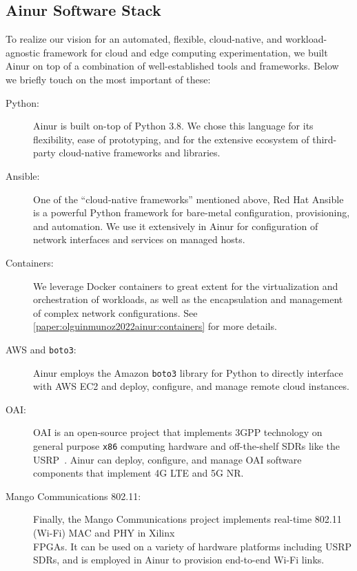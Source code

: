 \subsection{Ainur Software Stack}

To realize our vision for an automated, flexible, cloud-native, and workload-agnostic framework for cloud and edge computing experimentation, we built Ainur on top of a combination of well-established tools and frameworks.
Below we briefly touch on the most important of these:

\begin{description}
    \item[Python:]
    Ainur is built on-top of Python 3.8.
    We chose this language for its flexibility, ease of prototyping, and for the extensive ecosystem of third-party cloud-native frameworks and libraries.

    \item[Ansible:]
    One of the ``cloud-native frameworks'' mentioned above, Red Hat Ansible is a powerful Python framework for bare-metal configuration, provisioning, and automation.
    We use it extensively in Ainur for configuration of network interfaces and services on managed hosts.

    \item[Containers:]
    We leverage Docker containers to great extent for the virtualization and orchestration of workloads, as well as the encapsulation and management of complex network configurations.
    See \cref{paper:olguinmunoz2022ainur:containers} for more details.

    \item[\gls{AWS} and \texttt{boto3}:]
    Ainur employs the Amazon \texttt{boto3} library for Python to directly interface with \gls{AWS} \gls{EC2} and deploy, configure, and manage remote cloud instances.
    
    \item[\gls{OAI}:]
    \gls{OAI} is an open-source project that implements 3GPP technology on general purpose \texttt{x86} computing hardware and off-the-shelf \glspl{SDR} like the \gls{USRP}~\cite{kaltenberger2020openairinterface}.
    Ainur can deploy, configure, and manage \gls{OAI} software components that implement 4G \gls{LTE} and 5G \gls{NR}.
    
    \item[Mango Communications 802.11:]
    Finally, the Mango Communications project implements real-time 802.11 (Wi-Fi) MAC and PHY in Xilinx\\\glspl{FPGA}.
    It can be used on a variety of hardware platforms including \gls{USRP} \glspl{SDR}, and is employed in Ainur to provision end-to-end Wi-Fi links.
\end{description}

